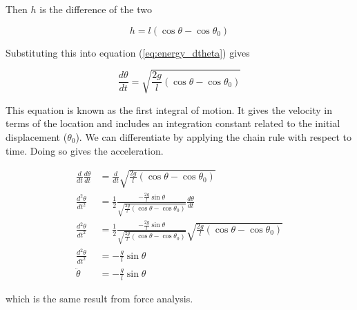 Then $h$ is the difference of the two

\begin{equation*}
  h = l(\cos\theta - \cos\theta_0)
\end{equation*}

Substituting this into equation (\ref{eq:energy_dtheta}) gives

\begin{equation*}
  \frac{d\theta}{dt} = \sqrt{\frac{2g}{l}(\cos\theta - \cos\theta_0)}
\end{equation*}

This equation is known as the first integral of motion. It gives the velocity in
terms of the location and includes an integration constant related to the
initial displacement ($\theta_0$). We can differentiate by applying the chain
rule with respect to time. Doing so gives the acceleration.

\begin{align*}
  \frac{d}{dt}\frac{d\theta}{dt} &=
    \frac{d}{dt}\sqrt{\frac{2g}{l}(\cos\theta - \cos\theta_0)} \\
  \frac{d^2\theta}{dt^2} &= \frac{1}{2}\frac
    {-\frac{2g}{l}\sin\theta}
    {\sqrt{\frac{2g}{l}(\cos\theta - \cos\theta_0)}}\frac{d\theta}{dt} \\
  \frac{d^2\theta}{dt^2} &= \frac{1}{2}\frac
    {-\frac{2g}{l}\sin\theta}
    {\sqrt{\frac{2g}{l}(\cos\theta - \cos\theta_0)}}
    \sqrt{\frac{2g}{l}(\cos\theta - \cos\theta_0)} \\
  \frac{d^2\theta}{dt^2} &= -\frac{g}{l}\sin\theta \\
  \ddot{\theta} &= -\frac{g}{l}\sin\theta
\end{align*}

which is the same result from force analysis.
